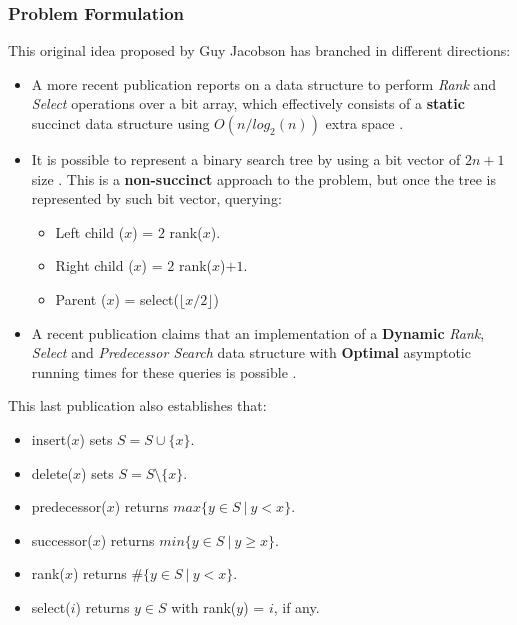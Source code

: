 \subsubsection{Problem Formulation}
This original idea proposed by Guy Jacobson has branched in different directions:
\begin{itemize}
    \item A more recent publication reports on a data structure to perform \textit{Rank} and \textit{Select} operations over a bit array, which effectively consists of a \textbf{static} succinct data structure using $O(n/log_2(n))$ extra space \cite{gonzalez2005practical}.
    \item It is possible to represent a binary search tree by using a bit vector of $2n+1$ size \cite{munro2004succinct}. This is a \textbf{non-succinct} approach to the problem, but once the tree is represented by such bit vector, querying:
    \begin{itemize}
        \item Left child ($x$) = $2$ rank($x$).
        \item Right child ($x$) = $2$ rank($x$)$+1$.
        \item Parent ($x$) = select($\lfloor x/2 \rfloor$)
    \end{itemize}
    
    \item A recent publication claims that an implementation of a \textbf{Dynamic} \textit{Rank}, \textit{Select} and \textit{Predecessor Search} data structure with \textbf{Optimal} asymptotic running times for these queries is possible \cite{patrascu2014dynamic}.
\end{itemize}

This last publication also establishes that: 
\begin{itemize}
    \item insert($x$) sets $S=S \cup \{x\}$.
    \item delete($x$) sets $S=S \setminus \{x\}$.
    \item predecessor($x$) returns $max\{y\in S\ |\ y < x\}$.
    \item successor($x$) returns $min\{y\in S\ |\ y \geq x\}$.
    \item rank($x$) returns $\#\{y\in S\ |\ y < x\}$.
    \item select($i$) returns $y \in S$ with rank($y$) = $i$, if any.
\end{itemize}

